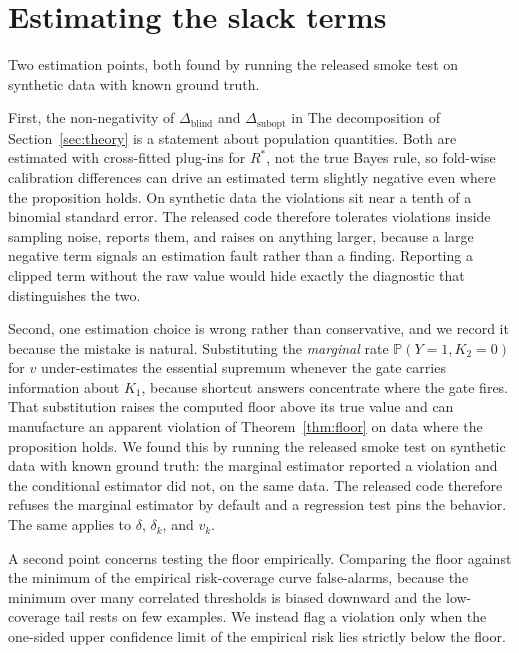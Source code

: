 \documentclass{article}
\begin{document}
\section{Estimating the slack terms}
\label{app:estimation}

Two estimation points, both found by running the released smoke test on synthetic data with known
ground truth.

First, the non-negativity of $\Delta_{\mathrm{blind}}$ and $\Delta_{\mathrm{subopt}}$ in
The decomposition of Section~\ref{sec:theory} is a statement about population quantities. Both are estimated with
cross-fitted plug-ins for $R^\ast$, not the true Bayes rule, so fold-wise calibration differences can
drive an estimated term slightly negative even where the proposition holds. On synthetic data the
violations sit near a tenth of a binomial standard error. The released code therefore tolerates
violations inside sampling noise, reports them, and raises on anything larger, because a large
negative term signals an estimation fault rather than a finding. Reporting a clipped term without the
raw value would hide exactly the diagnostic that distinguishes the two.

Second, one estimation choice is wrong rather than conservative, and we record it because the mistake
is natural. Substituting the \emph{marginal} rate $\mathbb{P}(Y=1,K_2=0)$ for $v$ under-estimates the
essential supremum whenever the gate carries information about $K_1$, because shortcut answers
concentrate where the gate fires. That substitution raises the computed floor above its true value
and can manufacture an apparent violation of Theorem~\ref{thm:floor} on data where the
proposition holds. We found this by running the released smoke test on synthetic data with known
ground truth: the marginal estimator reported a violation and the conditional estimator did not, on
the same data. The released code therefore refuses the marginal estimator by default and a
regression test pins the behavior. The same applies to $\delta$, $\delta_k$, and $v_k$.

A second point concerns testing the floor empirically. Comparing the floor against the minimum of the
empirical risk-coverage curve false-alarms, because the minimum over many correlated thresholds is
biased downward and the low-coverage tail rests on few examples. We instead flag a violation only
when the one-sided upper confidence limit of the empirical risk lies strictly below the floor.
\end{document}
